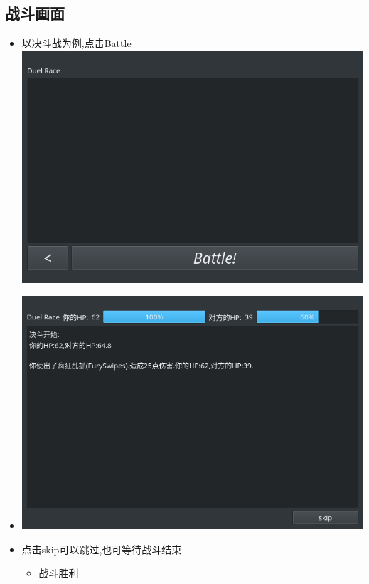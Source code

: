 \documentclass{article}
\begin{document}
\subsection{战斗画面}
\begin{itemize}
\item 以决斗战为例,点击Battle\\
  \includegraphics[width=15cm]{./pokemon/Battle.png}
\item \includegraphics[width=15cm]{./pokemon/战斗过程.png}
\item 点击skip可以跳过,也可等待战斗结束
  \begin{itemize}
  \item 战斗胜利\\
    \begin{center}

\end{center}
\end{itemize}
\end{itemize}
\end{document}
